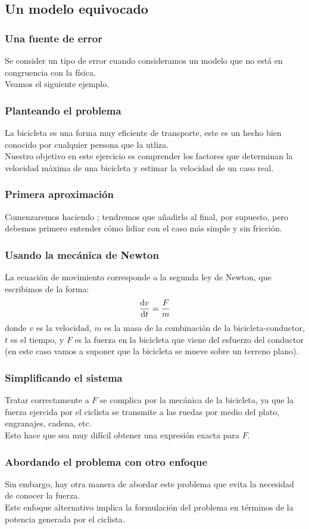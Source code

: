 \documentclass[12pt]{beamer}
\begin{document}
\subsection{Un modelo equivocado}

\begin{frame}
\frametitle{Una fuente de error}
Se consider un tipo de error cuando consideramos un modelo que no está en congruencia con la física.
\\
\bigskip
\pause
Veamos el siguiente ejemplo.
\end{frame}
\begin{frame}
\frametitle{Planteando el problema}
La bicicleta es una forma muy eficiente de transporte, este es un hecho bien conocido por cualquier persona que la utliza.
\\
\bigskip
\pause
Nuestro objetivo en este ejercicio es comprender los factores que determinan la velocidad máxima de una bicicleta y estimar la velocidad de un caso real.
\end{frame}
\begin{frame}
\frametitle{Primera aproximación}
Comenzaremos haciendo ; \pause tendremos que añadirlo al final, por supuesto, pero debemos primero entender cómo lidiar con el caso más simple y sin fricción.
\end{frame}
\begin{frame}
\frametitle{Usando la mecánica de Newton}
La ecuación de movimiento corresponde a la segunda ley de Newton, que escribimos de la forma:
\pause
\begin{equation}
\dv{v}{t} = \dfrac{F}{m}
\label{EqNewton2}
\end{equation}
donde $v$ es la velocidad, $m$ es la masa de la combinación de la bicicleta-conductor, $t$ es el tiempo, y $F$ es la fuerza en la bicicleta que viene del esfuerzo del conductor (en este caso vamos a suponer que la bicicleta se mueve sobre un terreno plano).
\end{frame}
\begin{frame}
\frametitle{Simplificando el sistema}
Tratar correctamente a $F$ se complica por la mecánica de la bicicleta, \pause ya que la fuerza ejercida por el ciclista se transmite a las ruedas por medio del plato, engranajes, cadena, etc.
\\
\bigskip
\pause
Esto hace que sea muy difícil obtener una expresión exacta para $F$.
\end{frame}
\begin{frame}
\frametitle{Abordando el problema con otro enfoque}
Sin embargo, hay otra manera de abordar este problema que evita la necesidad de conocer la fuerza.
\\
\bigskip
\pause
Este enfoque alternativo implica la formulación del problema en términos de la potencia generada por el ciclista.
\end{frame}
\end{document}
